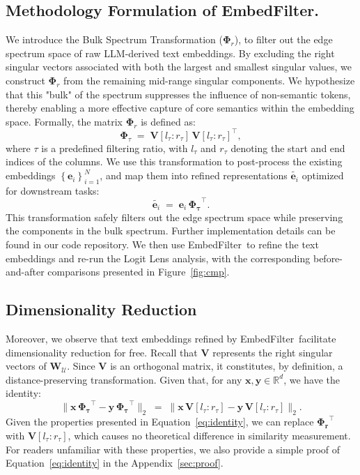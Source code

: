 \documentclass{llmxive}
\providecommand{\bm}[1]{\boldsymbol{#1}}
\providecommand{\name}{EmbedFilter}
\providecommand{\ve}{{\bm{e}}}
\providecommand{\vx}{{\bm{x}}}
\providecommand{\vy}{{\bm{y}}}
\providecommand{\mV}{{\bm{V}}}
\providecommand{\mW}{{\bm{W}}}
\begin{document}
\subsection{Methodology Formulation of \name.} 
We introduce the Bulk Spectrum Transformation ($\bm{\Phi}_r$), to filter out the edge spectrum space of raw LLM-derived text embeddings.
By excluding the right singular vectors associated with both the largest and smallest singular values, we construct \(\bm\Phi_r\) from the remaining mid-range singular components. 
We hypothesize that this "bulk" of the spectrum suppresses the influence of non-semantic tokens, thereby enabling a more effective capture of core semantics within the embedding space.
Formally, the matrix \(\bm\Phi_r\) is defined as:
{\Large \begin{equation*}
    \label{eq:filter}
    \bm\Phi_{\tau} \; = \; \mV{\left[l_\tau:r_\tau\right]
    \, \mV{\left[l_\tau:r_\tau\right]}^{\top}},
\end{equation*}}
where \(\tau\) is a predefined filtering ratio, with \(l_\tau\) and \(r_\tau\) denoting the start and end indices of the columns.
We use this transformation to post-process the existing embeddings \(\left\{\ve_i\right\}_{i=1}^{N}\),
and map them into refined representations \(\widetilde{\ve_i}\) optimized for downstream tasks:
{\Large \[
    \widetilde{\ve_i} \; = \; \ve_i \, \bm{\Phi_\tau}^\top.
\]}
This transformation safely filters out the edge spectrum space while preserving the components in the bulk spectrum. 
Further implementation details can be found in our code repository.
We then use \name\ to refine the text embeddings and re-run the Logit Lens analysis, with the corresponding before-and-after comparisons presented in Figure~\ref{fig:cmp}.

\subsection{Dimensionality Reduction}
Moreover, we observe that text embeddings refined by \name\ facilitate dimensionality reduction for free.
Recall that \(\mV\) represents the right singular vectors of \(\mW_{\mathcal{U}}\).
Since \(\mV\) is an orthogonal matrix, it constitutes, by definition, a distance-preserving transformation.
Given that, for any \(\vx,\vy \in \mathbb{R}^d\), we have the identity:
{\Large \begin{equation}
    \label{eq:identity}
    \|\vx \, \bm{\Phi_\tau}^\top - \vy \, \bm{\Phi_\tau}^\top\|_2 \; = \; \|\vx \,\mV{\left[l_\tau:r_\tau\right]} - \vy \, \mV{\left[l_\tau:r_\tau\right]}\|_2.
\end{equation}}
Given the properties presented in Equation~\ref{eq:identity}, we can replace \(\bm{\Phi_r}^\top\) with \(\mV\left[l_\tau:r_\tau\right]\), which causes no theoretical difference in similarity measurement.
For readers unfamiliar with these properties, we also provide a simple proof of Equation~\ref{eq:identity} in the Appendix~\ref{sec:proof}.
\end{document}
